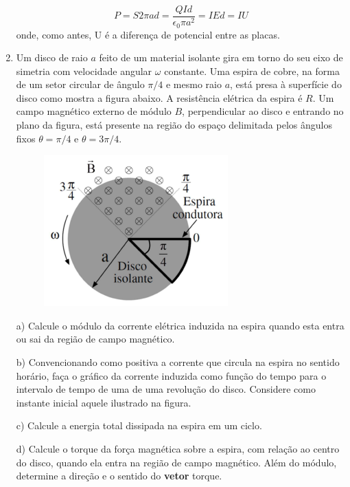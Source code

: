 \begin{enumerate}[start=1,label={\bfseries Q\arabic*.}]
$$
P=S 2 \pi a d=\frac{Q I d}{\epsilon_{0} \pi a^{2}}=I E d=I U
$$
onde, como antes, U é a diferença de potencial entre as placas.







\item Um disco de raio $a$ feito de um material isolante gira em torno do seu eixo de simetria com velocidade angular $\omega$ constante. Uma espira de cobre, na forma de um setor circular de ângulo $\pi/4$ e mesmo raio $a$, está presa à superfície do disco como mostra a figura abaixo. A resistência elétrica da espira é $R$. Um campo magnético externo de módulo $B$, perpendicular ao disco e entrando no plano da figura, está presente na região do espaço delimitada pelos ângulos fixos $\theta = \pi/4$ e $\theta = 3 \pi/4$.

\begin{figure}[H]
\centering
\includegraphics[scale=0.8]{eletromag-img/espira}
\end{figure}



a) Calcule o módulo da corrente elétrica induzida na espira quando esta entra ou sai da região de campo magnético.

\resposta

b) Convencionando como positiva a corrente que circula na espira no sentido horário, faça o gráfico da corrente induzida como função do tempo para o intervalo de tempo de uma de uma revolução do disco. Considere como instante inicial aquele ilustrado na figura.

\resposta

c) Calcule a energia total dissipada na espira em um ciclo.

\resposta

d) Calcule o torque da força magnética sobre a espira, com relação ao centro do disco, quando ela entra na região de campo magnético. Além do módulo, determine a direção e o sentido do \textbf{vetor} torque.


\end{enumerate}
